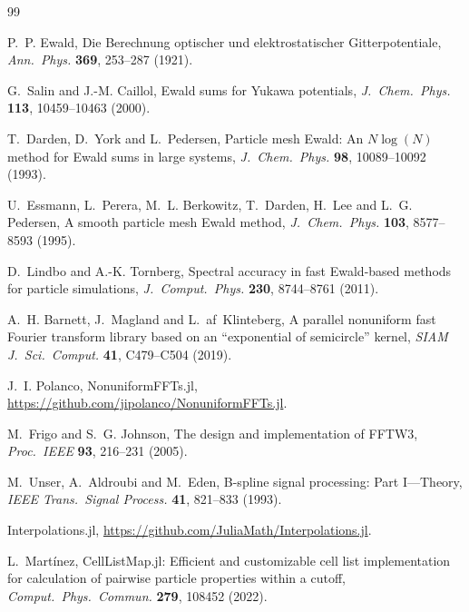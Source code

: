\documentclass[11pt,a4paper]{article}
\begin{document}
\begin{thebibliography}{99}

P.~P. Ewald, Die Berechnung optischer und elektrostatischer Gitterpotentiale,
\emph{Ann.\ Phys.} \textbf{369}, 253--287 (1921).

G.~Salin and J.-M. Caillol, Ewald sums for Yukawa potentials,
\emph{J.\ Chem.\ Phys.} \textbf{113}, 10459--10463 (2000).

T.~Darden, D.~York and L.~Pedersen, Particle mesh Ewald: An $N\log(N)$ method for Ewald sums in
large systems, \emph{J.\ Chem.\ Phys.} \textbf{98}, 10089--10092 (1993).

U.~Essmann, L.~Perera, M.~L. Berkowitz, T.~Darden, H.~Lee and L.~G. Pedersen, A smooth particle
mesh Ewald method, \emph{J.\ Chem.\ Phys.} \textbf{103}, 8577--8593 (1995).

D.~Lindbo and A.-K. Tornberg, Spectral accuracy in fast Ewald-based methods for particle
simulations, \emph{J.\ Comput.\ Phys.} \textbf{230}, 8744--8761 (2011).

A.~H. Barnett, J.~Magland and L.~af~Klinteberg, A parallel nonuniform fast Fourier transform
library based on an ``exponential of semicircle'' kernel, \emph{SIAM J.\ Sci.\ Comput.}
\textbf{41}, C479--C504 (2019).

J.~I. Polanco, NonuniformFFTs.jl, \url{https://github.com/jipolanco/NonuniformFFTs.jl}.

M.~Frigo and S.~G. Johnson, The design and implementation of FFTW3, \emph{Proc.\ IEEE}
\textbf{93}, 216--231 (2005).

M.~Unser, A.~Aldroubi and M.~Eden, B-spline signal processing: Part I---Theory,
\emph{IEEE Trans.\ Signal Process.} \textbf{41}, 821--833 (1993).

Interpolations.jl, \url{https://github.com/JuliaMath/Interpolations.jl}.

L.~Martínez, CellListMap.jl: Efficient and customizable cell list implementation for calculation
of pairwise particle properties within a cutoff, \emph{Comput.\ Phys.\ Commun.} \textbf{279},
108452 (2022).

\end{thebibliography}
\end{document}
